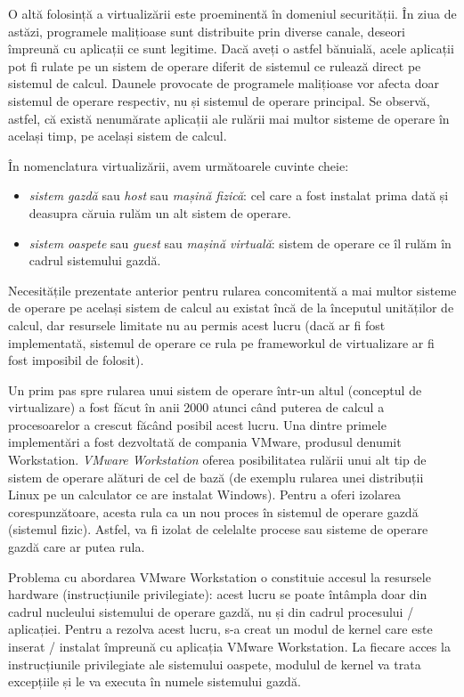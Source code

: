 O altă folosință a virtualizării este proeminentă în domeniul securității.
În ziua de astăzi, programele malițioase sunt distribuite prin diverse canale, deseori împreună cu aplicații ce sunt legitime.
Dacă aveți o astfel bănuială, acele aplicații pot fi rulate pe un sistem de operare diferit de sistemul ce rulează direct pe sistemul de calcul.
 Daunele provocate de programele malițioase vor afecta doar sistemul de operare respectiv, nu și sistemul de operare principal.
Se observă, astfel, că există nenumărate aplicații ale rulării mai multor sisteme de operare în același timp, pe același sistem de calcul.

În nomenclatura virtualizării, avem următoarele cuvinte cheie:

\begin{itemize}
  \item \textit{sistem gazdă} sau \textit{host} sau \textit{mașină fizică}: cel care a fost instalat prima dată și deasupra căruia rulăm un alt sistem de operare.
  \item \textit{sistem oaspete} sau \textit{guest} sau \textit{mașină virtuală}: sistem de operare ce îl rulăm în cadrul sistemului gazdă.
\end{itemize}

Necesitățile prezentate anterior pentru rularea concomitentă a mai multor sisteme de operare pe același sistem de calcul au existat încă de la începutul unităților de calcul, dar resursele limitate nu au permis acest lucru (dacă ar fi fost implementată, sistemul de operare ce rula pe frameworkul de virtualizare ar fi fost imposibil de folosit).

Un prim pas spre rularea unui sistem de operare într-un altul (conceptul de virtualizare) a fost făcut în anii 2000 atunci când puterea de calcul a procesoarelor a crescut făcând posibil acest lucru.
Una dintre primele implementări a fost dezvoltată de compania VMware, produsul denumit Workstation.
\textit{VMware Workstation} oferea posibilitatea rulării unui alt tip de sistem de operare alături de cel de bază (de exemplu rularea unei distribuții Linux pe un calculator ce are instalat Windows).
Pentru a oferi izolarea corespunzătoare, acesta rula ca un nou proces în sistemul de operare gazdă (sistemul fizic).
Astfel, va fi izolat de celelalte procese sau sisteme de operare gazdă care ar putea rula.

Problema cu abordarea VMware Workstation o constituie accesul la resursele hardware (instrucțiunile privilegiate): acest lucru se poate întâmpla doar din cadrul nucleului sistemului de operare gazdă, nu și din cadrul procesului / aplicației.
Pentru a rezolva acest lucru, s-a creat un modul de kernel care este inserat / instalat împreună cu aplicația VMware Workstation.
La fiecare acces la instrucțiunile privilegiate ale sistemului oaspete, modulul de kernel va trata excepțiile și le va executa în numele sistemului gazdă.

